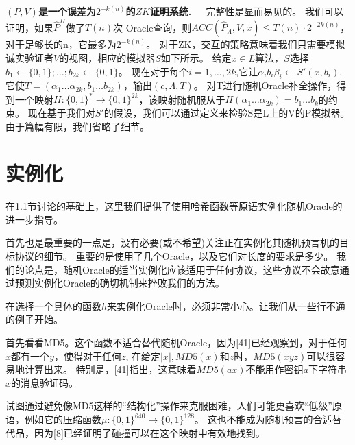 \documentclass[]{article}
\begin{document}
    
    \textbf{$(P,V)$是一个误差为$2^{-k(n)}$的$ZK$证明系统.}\ \ \ 
    完整性是显而易见的。
    我们可以证明，如果$\hat{P}^H$做了$T(n)$次 Oracle查询，则$ACC(\hat{P}_{\Lambda},V,x)\leq T(n)\cdot 2^{-2k(n)}$，对于足够长的n，它最多为$2^{-k(n)}$。
    对于ZK，交互的策略意味着我们只需要模拟诚实验证者$V$的视图，相应的模拟器$S$如下所示。
    给定$x\in L$算法，$S$选择$b_1\leftarrow \{0,1\};\ldots;b_{2k}\leftarrow \{0,1\}$。
    现在对于每个$i=1,\ldots,2k$,它让$\alpha_i b_i \beta_i \leftarrow S'(x,b_i)$.
    它使$T=(\alpha_1 \ldots \alpha_{2k},b_1 \ldots b_{2k})$，输出$(c,\Lambda,T)$。
    对T进行随机Oracle补全操作，得到一个映射$H:\{0,1\}^*\rightarrow \{0,1\}^{2k}$，该映射随机服从于$H(\alpha_1 \ldots \alpha_{2k})=b_1 \ldots b_{k}$的约束。
    现在基于我们对$S'$的假设，我们可以通过定义来检验S是L上的V的P模拟器。
    由于篇幅有限，我们省略了细节。
    
    
    
    \section{实例化}
    
    在1.1节讨论的基础上，这里我们提供了使用哈希函数等原语实例化随机Oracle的进一步指导。
    \par
    
    首先也是最重要的一点是，没有必要(或不希望)关注正在实例化其随机预言机的目标协议的细节。
    重要的是使用了几个Oracle，以及它们对长度的要求是多少。
    我们的论点是，随机Oracle的适当实例化应该适用于任何协议，这些协议不会故意通过预测实例化Oracle的确切机制来挫败我们的方法。
    \par
    
    在选择一个具体的函数$h$来实例化Oracle时，必须非常小心。让我们从一些行不通的例子开始。
    \par
    
    首先看看MD5。这个函数不适合替代随机Oracle，因为[41]已经观察到，对于任何$x$都有一个$y$，使得对于任何$z$, 在给定$|x|,MD5(x)$和$z$时，$MD5(xyz)$可以很容易地计算出来。
    特别是，[41]指出，这意味着$MD5(ax)$不能用作密钥$a$下字符串$x$的消息验证码。
    \par
    
    试图通过避免像MD5这样的“结构化”操作来克服困难，人们可能更喜欢“低级”原语，例如它的压缩函数$\mu:\{0,1\}^{640}\rightarrow \{0,1\}^{128}$。
    这也不能成为随机预言的合适替代品，因为[8]已经证明了碰撞可以在这个映射中有效地找到。
    \par
    
\end{document}
